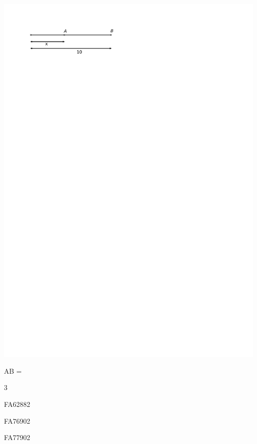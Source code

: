 \documentclass[a4paper,11pt]{report}
\begin{document}
\begin{exop}
{\begin{tasks}
     \includegraphics[scale=1.1]{media/fa-10/ligne3.pdf}

AB = \hrulefill

\end{tasks}
}
{3}
\end{exop}

\begin{exol}{FA62}{88}{2}
\end{exol}

\begin{exol}{FA76}{90}{2}
\end{exol}

\begin{exol}{FA77}{90}{2}
\end{exol}
\end{document}
